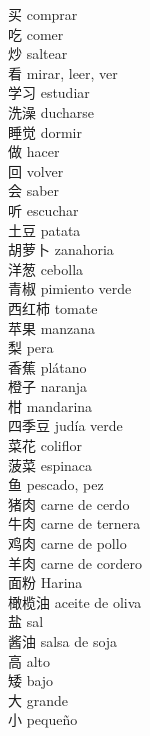 \documentclass[13pt]{article}
\begin{document}

\begin{CJK*}{UTF8}{gkai}
\begin{multicols}{2}
\begin{pinyinscope}
\LARGE
\noindent
买 \quad comprar\\
吃 \quad comer\\
炒 \quad saltear\\
看 \quad mirar, leer, ver\\
学习 \quad estudiar\\
洗澡 \quad ducharse\\
睡觉 \quad dormir\\
做 \quad hacer\\
回 \quad volver\\
会 \quad saber\\
听 \quad escuchar\\
土豆 \quad patata\\
胡萝卜 \quad zanahoria\\
洋葱 \quad cebolla\\
青椒 \quad pimiento verde\\
西红柿 \quad tomate\\
苹果 \quad manzana\\
梨 \quad pera\\
香蕉 \quad plátano\\
橙子 \quad naranja\\
柑 \quad mandarina\\
四季豆 \quad judía verde\\
菜花 \quad coliflor\\
菠菜 \quad espinaca\\
鱼 \quad pescado, pez\\
猪肉 \quad carne de cerdo\\
牛肉 \quad carne de ternera\\
鸡肉 \quad carne de pollo\\
羊肉 \quad carne de cordero\\
面粉 \quad Harina\\
橄榄油 \quad aceite de oliva\\
盐 \quad sal\\
酱油 \quad salsa de soja\\
高 \quad alto\\
矮 \quad bajo\\
大 \quad grande\\
小 \quad pequeño\\

\end{pinyinscope}
\end{multicols}
\end{CJK*}
\end{document}
